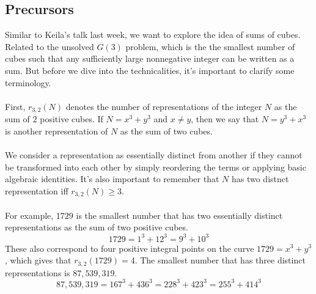 \documentclass[8pt]{extarticle}
\begin{document}
\subsection{Precursors}
Similar to Keila's talk last week, we want to explore the idea of sums of cubes. Related to the unsolved $G(3)$ problem, which is the the smallest number of cubes such that any sufficiently large nonnegative integer can be written as a sum. 
But before we dive into the technicalities, it's important to  clarify some terminology.\\
\\
First, $r_{3,2}(N)$ denotes the number of representations of the integer $N$ as the sum of $2$ positive cubes. If $N = x^3 + y^3$ and $x \neq y$, then we say that $N = y^3 + x^3$ is another representation of $N$ as the sum of two cubes. \\
\\
We consider a representation as essentially distinct from another if they cannot be transformed into each other by simply reordering the terms or applying basic algebraic identities. It's also important to remember that $N$ has two distnct representation iff $r_{3,2}(N) \geq 3$. \\
\\
For example, $1729$ is the smallest number that has two essentially distinct representations as the sum of two positive cubes. 
$$
1729 = 1^3 + 12^3 = 9^3 + 10^3
$$
These also correspond to four positive integral points on the curve $1729 = x^3 + y^3$, which gives that $r_{3,2}(1729) = 4$. The smallest number that has three distinct representations is $87,539,319$.
$$
87,539,319 = 167^3 + 436^3 = 228^3 + 423^3 = 255^3 + 414^3
$$
\end{document}
